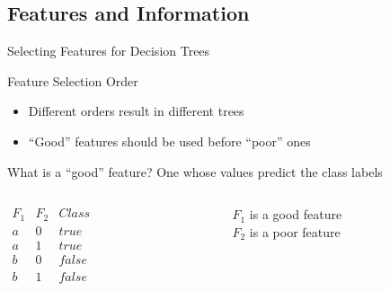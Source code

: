 \documentclass[14pt]{beamer}
\begin{document}
\subsection{Features and Information}

\begin{frame}{Selecting Features for Decision Trees}
\begin{block}{Feature Selection Order}
\begin{itemize}
\item Different orders result in different trees
\item ``Good'' features should be used before ``poor'' ones
\end{itemize}
\end{block}
\pause
\begin{block}{What is a ``good'' feature?}
One whose values predict the class labels \\
\end{block}
\pause
\medskip
\begin{columns}
\begin{column}{1.2in}
$
\begin{array}{lll}
F_1 & F_2 & \textit{Class} \\
\hline
a & 0 & \textit{true} \\
a & 1 & \textit{true} \\
b & 0 & \textit{false} \\
b & 1 & \textit{false} \\
\end{array}
$
\end{column}
\pause
\begin{column}{1.8in}
$F_1$ is a \alert{good} feature \\
\bigskip
$F_2$ is a \alert{poor} feature
\end{column}
\end{columns}
\end{frame}
\end{document}
